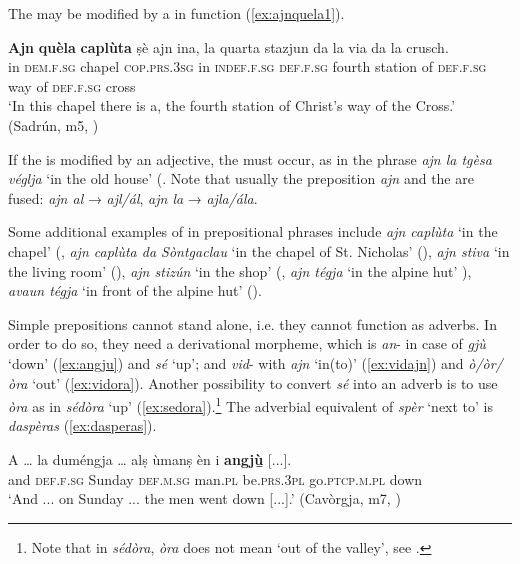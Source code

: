 The  may be modified by a  in  function (\ref{ex:ajnquela1}).

\ea
\label{ex:ajnquela1}
\gll \textbf{Ajn} \textbf{quèla} \textbf{caplùta} ṣè ajn ina, la quarta stazjun da la via da la crusch.\\
in \textsc{dem.f.sg} chapel \textsc{cop.prs.3sg} in \textsc{indef.f.sg} \textsc{def.f.sg} fourth station of \textsc{def.f.sg} way of \textsc{def.f.sg} cross \\
\glt `In this chapel there is a, the fourth station of Christ’s way of the Cross.' (Sadrún, m5, )
\z

If the  is modified by an adjective, the  must occur, as in the phrase \textit{ajn la tgèsa véglja} `in the old house' (\citealt[30]{Büchli1966}. Note that usually the preposition \textit{ajn} and the  are fused: \textit{ajn al} → \textit{ajl/ál}, \textit{ajn la} → \textit{ajla/ála}.

Some additional examples of  in prepositional phrases include \textit{ajn caplùta} `in the chapel' (\citealt[45]{Büchli1966}, \textit{ajn caplùta da Sòntgaclau} `in the chapel of St. Nicholas' (\citealt[45]{Büchli1966}), \textit{ajn stiva} `in the living room' (), \textit{ajn stizún} `in the shop' (\citep[123]{Büchli1966}, \textit{ajn tégja} `in the alpine hut' \citealt[122]{Büchli1966}), \textit{avaun tégja} `in front of the alpine hut' ().

Simple prepositions cannot stand alone, i.e. they cannot function as adverbs. In order to do so, they need a derivational morpheme, which is \textit{an}- in case of \textit{gjù} `down' (\ref{ex:angju}) and \textit{sé} `up'; and \textit{vid}- with \textit{ajn} `in(to)'  (\ref{ex:vidajn}) and \textit{ò/òr/òra} `out' (\ref{ex:vidora}). Another possibility to convert \textit{sé} into an adverb is to use \textit{òra} as in \textit{sédòra} `up' (\ref{ex:sedora}).\footnote{Note that in \textit{sédòra}, \textit{òra} does not mean `out of the valley', see  .} The adverbial equivalent of \textit{spèr} `next to' is \textit{daspèras} (\ref{ex:dasperas}).

\ea
\label{ex:angju}
\gll A … la duméngja … alṣ ùmanṣ èn i \textbf{angjù̱} [...].\\
and {} \textsc{def.f.sg} Sunday {} \textsc{def.m.sg} man.\textsc{pl} be.\textsc{prs.3pl} go.\textsc{ptcp.m.pl} down\\
\glt `And ... on Sunday ... the men went down [...].' (Cavòrgja, m7, )
\z

